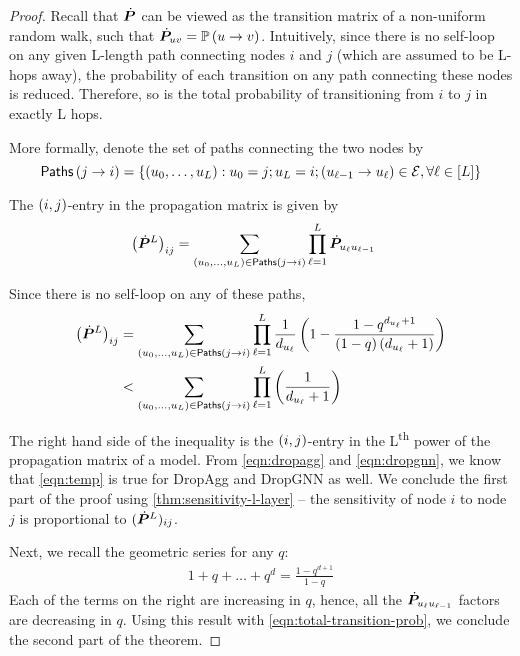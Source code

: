 \begin{proof}
    Recall that $\dot{\bm{P}}$ can be viewed as the transition matrix of a non-uniform random walk, such that $\dot{\bm{P}}_{uv} = \mathbb{P}\left(u\to v\right)$. Intuitively, since there is no self-loop on any given L-length path connecting nodes $i$ and $j$ (which are assumed to be L-hops away), the probability of each transition on any path connecting these nodes is reduced. Therefore, so is the total probability of transitioning from $i$ to $j$ in exactly L hops.
    
    More formally, denote the set of paths connecting the two nodes by
    $$
        \mathsf{Paths}\left(j\to i\right) = \left\{\left(u_0,\ldots,u_L\right): u_0 = j; u_L = i; \left(u_{\ell-1} \to u_{\ell}\right)\in\mathcal{E}, \forall \ell\in\left[L\right]\right\}
    $$
    
    The $\left(i,j\right)$-entry in the propagation matrix is given by
    \begin{align}
        \left(\dot{\bm{P}}^L\right)_{ij} &= \sum_{\left(u_0,\ldots,u_L\right)\in\mathsf{Paths}\left(j\to i\right)} \prod_{\ell=1}^L \dot{\bm{P}}_{u_{\ell}u_{\ell-1}}
    \label{eqn:total-transition-prob}
    \end{align}
    
    Since there is no self-loop on any of these paths,
    \begin{align}
        \left(\dot{\bm{P}}^L\right)_{ij} &= \sum_{\left(u_0,\ldots,u_L\right)\in\mathsf{Paths}\left(j\to i\right)} \prod_{\ell=1}^L \frac{1}{d_{u_{\ell}}}\left(1-\frac{1-q^{d_{u_{\ell}}+1}}{\left(1-q\right)\left(d_{u_{\ell}}+1\right)}\right) \\
        &< \sum_{\left(u_0,\ldots,u_L\right)\in\mathsf{Paths}\left(j\to i\right)} \prod_{\ell=1}^L \left(\frac{1}{d_{u_{\ell}}+1}\right) \label{eqn:temp}
    \end{align}
    
    The right hand side of the inequality is the $\left(i,j\right)$-entry in the L\textsuperscript{th} power of the propagation matrix of a  model. From \autoref{eqn:dropagg} and \autoref{eqn:dropgnn}, we know that \autoref{eqn:temp} is true for DropAgg and DropGNN as well. We conclude the first part of the proof using \autoref{thm:sensitivity-l-layer} -- the sensitivity of node $i$ to node $j$ is proportional to $(\dot{\bm{P}}^L)_{ij}$. 
    
    Next, we recall the geometric series for any $q$:
    \begin{align}
        1+q+\ldots+q^d = \frac{1-q^{d+1}}{1-q}
    \end{align}
    Each of the terms on the right are increasing in $q$, hence, all the $\dot{\bm{P}}_{u_{\ell}u_{\ell-1}}$ factors are decreasing in $q$. Using this result with \autoref{eqn:total-transition-prob}, we conclude the second part of the theorem.
    
\end{proof}